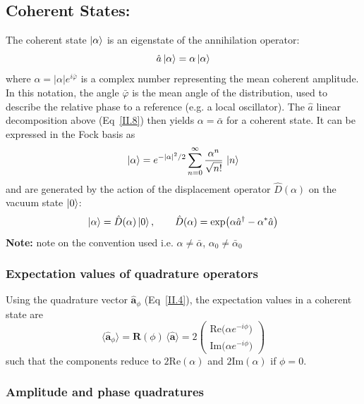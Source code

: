 \subsection*{Coherent States:}
The coherent state $\ket{\alpha}$ is an eigenstate of the annihilation operator:
\begin{equation}
\hat{a}\ket{\alpha} = \alpha \ket{\alpha}
\label{II.14}
\end{equation}
where $\alpha = |\alpha| e^{i\bar{\varphi}}$ is a complex number representing the mean coherent amplitude. In this notation, the angle $\bar{\varphi}$ is the mean angle of the distribution, used to describe the relative phase to a reference (e.g. a local oscillator). The $\hat{a}$ linear decomposition above (Eq~\eqref{II.8}) then yields $\alpha = \bar{\alpha}$ for a coherent state. It can be expressed in the Fock basis as
\begin{equation}
\ket{\alpha} = e^{-|\alpha|^2/2} \sum_{n=0}^\infty \frac{\alpha^n}{\sqrt{n!}}\,\ket{n}
\label{II.15}
\end{equation}
and are generated by the action of the displacement operator $\hat{D}(\alpha)$ on the vacuum state $\ket{0}$:
\begin{equation}
\ket{\alpha} = \hat{D}(\alpha)\ket{0},\qquad \hat{D}(\alpha) = \exp\!\left(\alpha \hat{a}^\dagger - \alpha^* \hat{a}\right)
\label{II.16}
\end{equation}
\noindent \textbf{Note:} \color{red} note on the convention used i.e. $\alpha \neq \bar{\alpha}$, $\alpha_0 \neq \bar{\alpha}_0$ \color{black}
\subsubsection*{Expectation values of quadrature operators}

Using the quadrature vector $\hat{\mathbf{a}}_\phi$ (Eq~\ref{II.4}), the expectation values in a coherent state are
\begin{equation}
\langle \hat{\mathbf a}_\phi\rangle
= \mathbf R(\phi)\,\langle \hat{\mathbf a}\rangle
=
2\begin{pmatrix}
\mathrm{Re}\big(\alpha e^{-i\phi}\big) \\[2pt]
\mathrm{Im}\big(\alpha e^{-i\phi}\big)
\end{pmatrix}
\end{equation}
such that the components reduce to $2\mathrm{Re} (\alpha)$ and  $2\mathrm{Im} (\alpha)$ if $\phi=0$. 

\subsubsection*{Amplitude and phase quadratures}

